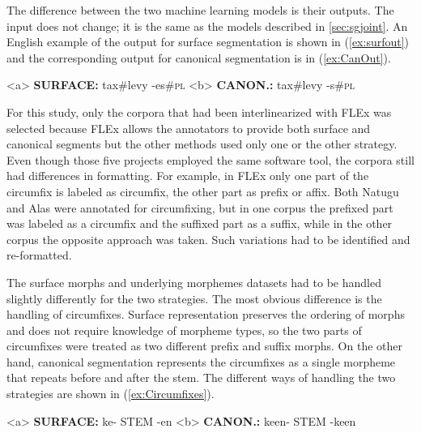 The difference between the two machine learning models is their outputs. The input does not change; it is the same as the models described in \autoref{sec:sgjoint}. An English example of the output for surface segmentation is shown in (\ref{ex:surfout}) and the corresponding output for canonical segmentation is in (\ref{ex:CanOut}).

\pex   
\label{ex:CanInOut}
\a<a> \textbf{SURFACE:} \hspace{2 mm} tax\#levy \hspace{3 mm} -es\#\textsc{pl}
\label{ex:surfout}
\a<b> \textbf{CANON.:} \hspace{4 mm} tax\#levy \hspace{3 mm} -s\#\textsc{pl} 
\label{ex:CanOut}
\xe

For this study, only the corpora that had been interlinearized with FLEx was selected because FLEx allows the annotators to provide both surface and canonical segments but the other methods used only one or the other strategy. 
Even though those five projects employed the same software tool, the corpora still had differences in formatting. For example, in FLEx only one part of the circumfix is labeled as circumfix, the other part as prefix or affix. Both Natugu and Alas were annotated for circumfixing, but in one corpus the prefixed part was labeled as a circumfix and the suffixed part as a suffix, while in the other corpus the opposite approach was taken. Such variations had to be identified and re-formatted.

The surface morphs and underlying morphemes datasets had to be handled slightly differently for the two strategies. The most obvious difference is the handling of circumfixes. Surface representation preserves the ordering of morphs and does not require knowledge of morpheme types, so the two parts of circumfixes were treated as two different prefix and suffix morphs.  On the other hand, canonical segmentation represents the circumfixes as a single morpheme that repeats before and after the stem. The different ways of handling the two strategies are shown in (\ref{ex:Circumfixes}).

\pex   
\label{ex:Circumfixes}
\a<a> \textbf{SURFACE:} \hspace{2 mm} ke- \hspace{4 mm}  STEM  \hspace{1 mm} -en
\label{ex:circumsurf}
\a<b> \textbf{CANON.:} \hspace{1 mm} ke\textlangle{}\textrangle{}en- \hspace{1 mm} STEM \hspace{1 mm} -ke\textlangle{}\textrangle{}en
\label{ex:circumcan}
\xe


